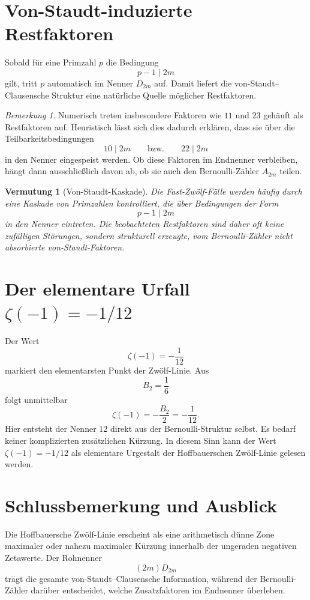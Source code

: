 \documentclass[11pt,a4paper]{article}
\theoremstyle{definition}
\theoremstyle{plain}
\newtheorem{vermutung}[definition]{Vermutung}
\theoremstyle{remark}
\newtheorem{bemerkung}[definition]{Bemerkung}
\begin{document}
\section{Von-Staudt-induzierte Restfaktoren}

Sobald für eine Primzahl $p$ die Bedingung
\[
p-1\mid 2m
\]
gilt, tritt $p$ automatisch im Nenner $D_{2m}$ auf. Damit liefert die von-Staudt--Clausensche Struktur eine natürliche Quelle möglicher Restfaktoren.

\begin{bemerkung}
Numerisch treten insbesondere Faktoren wie $11$ und $23$ gehäuft als Restfaktoren auf. Heuristisch lässt sich dies dadurch erklären, dass sie über die Teilbarkeitsbedingungen
\[
10\mid 2m
\qquad\text{bzw.}\qquad
22\mid 2m
\]
in den Nenner eingespeist werden. Ob diese Faktoren im Endnenner verbleiben, hängt dann ausschließlich davon ab, ob sie auch den Bernoulli-Zähler $A_{2m}$ teilen.
\end{bemerkung}

\begin{vermutung}[Von-Staudt-Kaskade]
Die Fast-Zwölf-Fälle werden häufig durch eine Kaskade von Primzahlen kontrolliert, die über Bedingungen der Form
\[
p-1\mid 2m
\]
in den Nenner eintreten. Die beobachteten Restfaktoren sind daher oft keine zufälligen Störungen, sondern strukturell erzeugte, vom Bernoulli-Zähler nicht absorbierte von-Staudt-Faktoren.
\end{vermutung}

\section{Der elementare Urfall \texorpdfstring{$\zeta(-1)=-1/12$}{zeta(-1)=-1/12}}

Der Wert
\[
\zeta(-1)=-\frac{1}{12}
\]
markiert den elementarsten Punkt der Zwölf-Linie. Aus
\[
B_2=\frac16
\]
folgt unmittelbar
\[
\zeta(-1)=-\frac{B_2}{2}=-\frac{1}{12}.
\]
Hier entsteht der Nenner $12$ direkt aus der Bernoulli-Struktur selbst. Es bedarf keiner komplizierten zusätzlichen Kürzung. In diesem Sinn kann der Wert $\zeta(-1)=-1/12$ als elementare Urgestalt der Hoffbauerschen Zwölf-Linie gelesen werden.

\section{Schlussbemerkung und Ausblick}

Die Hoffbauersche Zwölf-Linie erscheint als eine arithmetisch dünne Zone maximaler oder nahezu maximaler Kürzung innerhalb der ungeraden negativen Zetawerte. Der Rohnenner
\[
(2m)D_{2m}
\]
trägt die gesamte von-Staudt--Clausensche Information, während der Bernoulli-Zähler darüber entscheidet, welche Zusatzfaktoren im Endnenner überleben.
\end{document}
